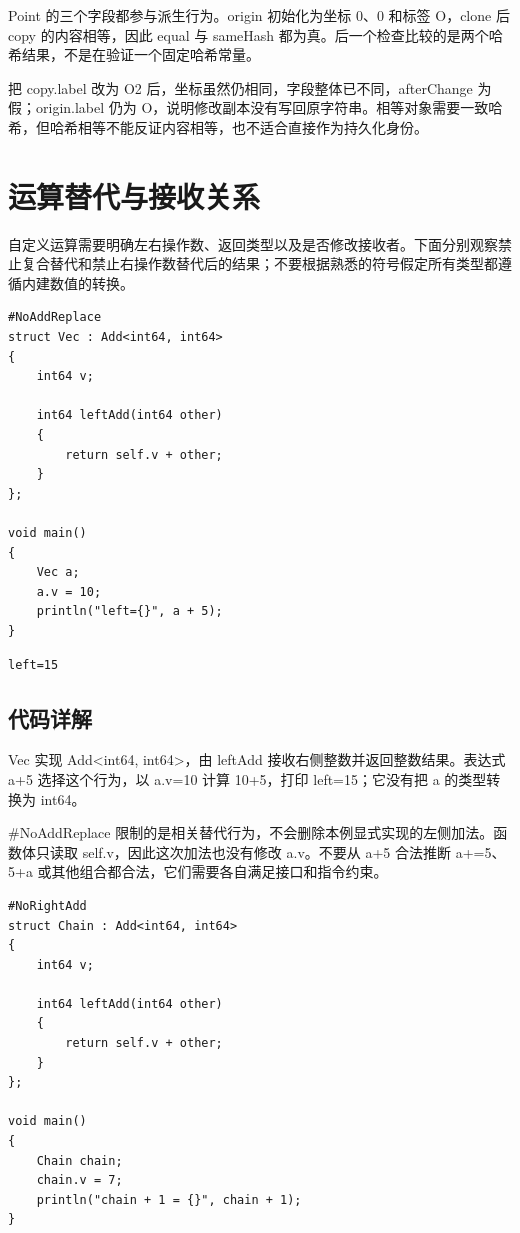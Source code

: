 Point 的三个字段都参与派生行为。origin 初始化为坐标 0、0 和标签 O，clone 后 copy 的内容相等，因此 equal 与 sameHash 都为真。后一个检查比较的是两个哈希结果，不是在验证一个固定哈希常量。

把 copy.label 改为 O2 后，坐标虽然仍相同，字段整体已不同，afterChange 为假；origin.label 仍为 O，说明修改副本没有写回原字符串。相等对象需要一致哈希，但哈希相等不能反证内容相等，也不适合直接作为持久化身份。

\section{运算替代与接收关系}

自定义运算需要明确左右操作数、返回类型以及是否修改接收者。下面分别观察禁止复合替代和禁止右操作数替代后的结果；不要根据熟悉的符号假定所有类型都遵循内建数值的转换。

\par
\medskip
\begin{lstlisting}[style=chali]
#NoAddReplace
struct Vec : Add<int64, int64>
{
    int64 v;

    int64 leftAdd(int64 other)
    {
        return self.v + other;
    }
};

void main()
{
    Vec a;
    a.v = 10;
    println("left={}", a + 5);
}
\end{lstlisting}
\par
\medskip

\par
\medskip
\begin{lstlisting}[style=out]
left=15
\end{lstlisting}
\par
\medskip

\subsection*{代码详解}

Vec 实现 Add<int64, int64>，由 leftAdd 接收右侧整数并返回整数结果。表达式 a+5 选择这个行为，以 a.v=10 计算 10+5，打印 left=15；它没有把 a 的类型转换为 int64。

\#NoAddReplace 限制的是相关替代行为，不会删除本例显式实现的左侧加法。函数体只读取 self.v，因此这次加法也没有修改 a.v。不要从 a+5 合法推断 a+=5、5+a 或其他组合都合法，它们需要各自满足接口和指令约束。

\par
\medskip
\begin{lstlisting}[style=chali]
#NoRightAdd
struct Chain : Add<int64, int64>
{
    int64 v;

    int64 leftAdd(int64 other)
    {
        return self.v + other;
    }
};

void main()
{
    Chain chain;
    chain.v = 7;
    println("chain + 1 = {}", chain + 1);
}
\end{lstlisting}
\par
\medskip

